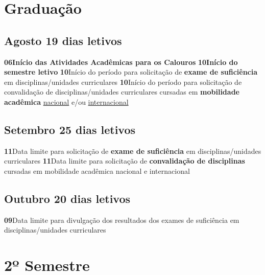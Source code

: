 \documentclass[thesis]{hmcposter}
\begin{document}
\begin{poster}
\section{\color{hmcorange}Graduação}\subsection{Agosto \hfill 19 dias letivos}\textbf{06}\qquad \textbf{Início das Atividades Acadêmicas para os Calouros} \newline \null\textbf{10}\qquad \textbf{Início do semestre letivo} \newline \null\textbf{10}\qquad Início do período para solicitação de \textbf{exame de suficiência} em disciplinas/unidades curriculares \newline \null\textbf{10}\qquad Início do período para solicitação de convalidação de disciplinas/unidades curriculares cursadas em \textbf{mobilidade acadêmica} \underline{nacional} e/ou \underline{internacional} \newline \null\subsection{Setembro \hfill 25 dias letivos}\textbf{11}\qquad Data limite para solicitação de \textbf{exame de suficiência} em disciplinas/unidades curriculares \newline \null\textbf{11}\qquad Data limite para solicitação de \textbf{convalidação de disciplinas} cursadas em mobilidade acadêmica nacional e internacional \newline \null\subsection{Outubro \hfill 20 dias letivos}\textbf{09}\qquad Data limite para divulgação dos resultados dos exames de suficiência em disciplinas/unidades curriculares \newline \null\vfill\null
\columnbreak
\section{\hfill \color{hmcorange}2º Semestre}

\end{poster}
\end{document}

